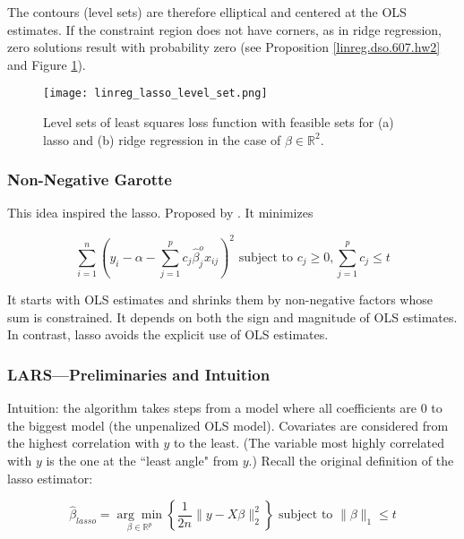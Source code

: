 The contours (level sets) are therefore elliptical and centered at the OLS estimates. If the constraint region does not have corners, as in ridge regression, zero solutions result with probability zero (see Proposition \ref{linreg.dso.607.hw2} and Figure \ref{linreg.lasso.level.set.figure}).

\begin{figure}[htbp]
\begin{center}
\texttt{[image: linreg\_lasso\_level\_set.png]}
\caption{Level sets of least squares loss function with feasible sets for (a) lasso and (b) ridge regression in the case of \(\beta \in \mathbb{R}^2\).}
\label{linreg.lasso.level.set.figure}
\end{center}
\end{figure}


\subsubsection{Non-Negative Garotte}

This idea inspired the lasso. Proposed by \citet{Breiman1995}. It minimizes

\[
\sum_{i=1}^n \left(y_i - \alpha - \sum_{j=1}^p c_j \hat{\beta}_j^o x_{ij} \right)^2 \text{ subject to } c_j \geq 0, \sum_{j=1}^p c_j \leq t
\]

It starts with OLS estimates and shrinks them by non-negative factors whose sum is constrained. It depends on both the sign and magnitude of OLS estimates. In contrast, lasso avoids the explicit use of OLS estimates.

\subsubsection{LARS---Preliminaries and Intuition}\label{lars.prelims}

Intuition: the algorithm takes steps from a model where all coefficients are 0 to the biggest model (the unpenalized OLS model). Covariates are considered from the highest correlation with \(y\) to the least. (The variable most highly correlated with \(y\) is the one at the ``least angle" from \(y\).) Recall the original definition of the lasso estimator:

\begin{equation}\label{linreg.lasso.constrained}
\hat{\beta}_{lasso} = \underset{\beta \in \mathbb{R}^p}{\arg \min}\left\{ \frac{1}{2n}\lVert y - X \beta \rVert_2^2 \right\} \text{ subject to } \lVert \beta \rVert_1 \leq t
\end{equation}

